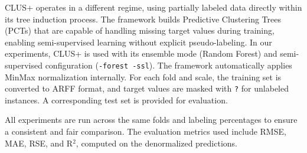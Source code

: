 CLUS+\cite{petkovic2023clusplus} operates in a different regime, using partially labeled data directly within its tree induction process. The framework builds Predictive Clustering Trees (PCTs) that are capable of handling missing target values during training, enabling semi-supervised learning without explicit pseudo-labeling. In our experiments, CLUS+ is used with its ensemble mode (Random Forest) and semi-supervised configuration (\texttt{-forest -ssl}). The framework automatically applies MinMax normalization internally. For each fold and scale, the training set is converted to ARFF format, and target values are masked with \texttt{?} for unlabeled instances. A corresponding test set is provided for evaluation.

All experiments are run across the same folds and labeling percentages to ensure a consistent and fair comparison. The evaluation metrics used include RMSE, MAE, RSE, and R$^2$, computed on the denormalized predictions.
